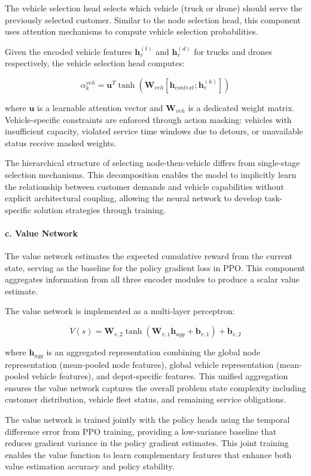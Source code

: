 The vehicle selection head selects which vehicle (truck or drone) should serve the previously selected customer. Similar to the node selection head, this component uses attention mechanisms to compute vehicle selection probabilities.

Given the encoded vehicle features $\mathbf{h}_v^{(t)}$ and $\mathbf{h}_v^{(d)}$ for trucks and drones respectively, the vehicle selection head computes:

\begin{equation}
\alpha_k^{veh} = \mathbf{u}^T \tanh(\mathbf{W}_{veh}[\mathbf{h}_{context}; \mathbf{h}_v^{(k)}])
\end{equation}

where $\mathbf{u}$ is a learnable attention vector and $\mathbf{W}_{veh}$ is a dedicated weight matrix. Vehicle-specific constraints are enforced through action masking: vehicles with insufficient capacity, violated service time windows due to detours, or unavailable status receive masked weights.

The hierarchical structure of selecting node-then-vehicle differs from single-stage selection mechanisms. This decomposition enables the model to implicitly learn the relationship between customer demands and vehicle capabilities without explicit architectural coupling, allowing the neural network to develop task-specific solution strategies through training.

\paragraph{c. Value Network}

The value network estimates the expected cumulative reward from the current state, serving as the baseline for the policy gradient loss in PPO. This component aggregates information from all three encoder modules to produce a scalar value estimate.

The value network is implemented as a multi-layer perceptron:

\begin{equation}
V(s) = \mathbf{W}_{v,2} \tanh(\mathbf{W}_{v,1} \mathbf{h}_{agg} + \mathbf{b}_{v,1}) + \mathbf{b}_{v,2}
\end{equation}

where $\mathbf{h}_{agg}$ is an aggregated representation combining the global node representation (mean-pooled node features), global vehicle representation (mean-pooled vehicle features), and depot-specific features. This unified aggregation ensures the value network captures the overall problem state complexity including customer distribution, vehicle fleet status, and remaining service obligations.

The value network is trained jointly with the policy heads using the temporal difference error from PPO training, providing a low-variance baseline that reduces gradient variance in the policy gradient estimates. This joint training enables the value function to learn complementary features that enhance both value estimation accuracy and policy stability.

